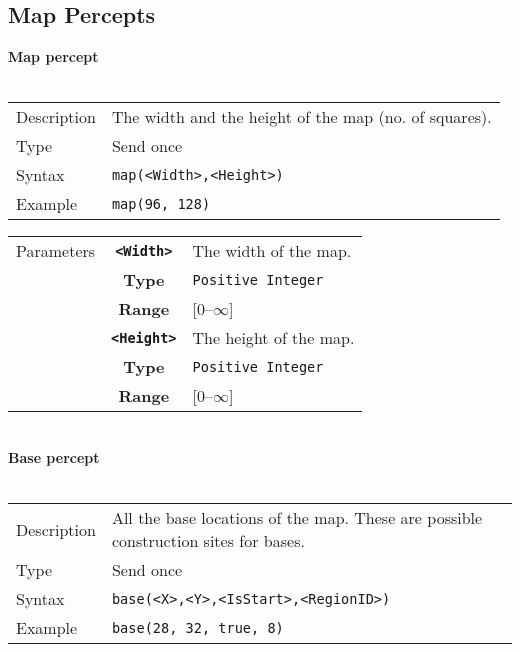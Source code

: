 \newpage
\subsection{Map Percepts}
\textbf{Map percept}\\
\\
\begin{tabularx}{\textwidth}{lX}
 Description & The width and the height of the map (no. of squares). \\
 Type & Send once \\
 Syntax & \verb|map(<Width>,<Height>)| \\
 Example & \verb|map(96, 128)| \\
 \end{tabularx}
 \begin{tabularx}{\textwidth}{l | c | p{8cm}|}
 \cline{2-3}
  Parameters & \textbf{\verb|<Width>|} & The width of the map.\\
            & \textbf{Type} & \verb|Positive Integer| \\
            & \textbf{Range} & [0--$\infty$] \\
            \cline{2-3}
            & \textbf{\verb|<Height>|} & The height of the map. \\
            & \textbf{Type} & \verb|Positive Integer| \\
            & \textbf{Range} & [0--$\infty$] \\
            \cline{2-3}
\end{tabularx}\\
\noindent
\textbf{Base percept}\\
\\
\begin{tabularx}{\textwidth}{lX}
 Description & All the base locations of the map. These are possible construction sites for bases. \\
 Type & Send once \\
 Syntax & \verb|base(<X>,<Y>,<IsStart>,<RegionID>)| \\
 Example & \verb|base(28, 32, true, 8)| \\
 \end{tabularx}
